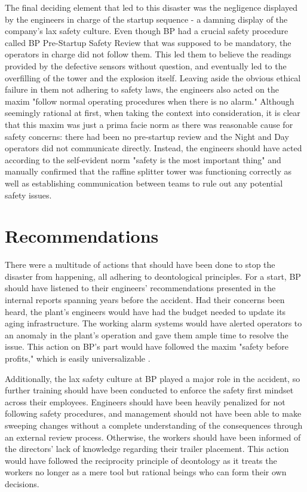 \documentclass[12pt]{article}
\begin{document}
	The final deciding element that led to this disaster was the negligence displayed by the engineers in charge of the startup sequence - a damning display of the company's lax safety culture. Even though BP had a crucial safety procedure called BP Pre-Startup Safety Review that was supposed to be mandatory, the operators in charge did not follow them. This led them to believe the readings provided by the defective sensors without question, and eventually led to the overfilling of the tower and the explosion itself. Leaving aside the obvious ethical failure in them not adhering to safety laws, the engineers also acted on the maxim "follow normal operating procedures when there is no alarm." Although seemingly rational at first, when taking the context into consideration, it is clear that this maxim was just a prima facie norm as there was reasonable cause for safety concerns: there had been no pre-startup review and the Night and Day operators did not communicate directly. Instead, the engineers should have acted according to the self-evident norm "safety is the most important thing" and manually confirmed that the raffine splitter tower was functioning correctly as well as establishing communication between teams to rule out any potential safety issues.
	
	\section*{Recommendations}
	There were a multitude of actions that should have been done to stop the disaster from happening, all adhering to deontological principles. For a start, BP should have listened to their engineers' recommendations presented in the internal reports spanning years before the accident. Had their concerns been heard, the plant's engineers would have had the budget needed to update its aging infrastructure. The working alarm systems would have alerted operators to an anomaly in the plant's operation and gave them ample time to resolve the issue. This action on BP's part would have followed the maxim "safety before profits," which is easily universalizable . 
	
	Additionally, the lax safety culture at BP played a major role in the accident, so further training should have been conducted to enforce the safety first mindset across their employees. Engineers should have been heavily penalized for not following safety procedures, and management should not have been able to make sweeping changes without a complete understanding of the consequences through an external review process. Otherwise, the workers should have been informed of the directors' lack of knowledge regarding their trailer placement. This action would have followed the reciprocity principle of deontology as it treats the workers no longer as a mere tool but rational beings who can form their own decisions. 
	
\end{document}
